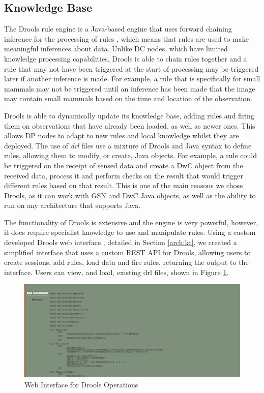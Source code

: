 		
	
	\subsection{Knowledge Base}\label{arch:kb}
	The Drools rule engine is a Java-based engine that uses forward chaining inference for the processing of rules \cite{proctor2005drools}, which means that rules are used to make meaningful inferences about data. Unlike DC nodes, which have limited knowledge processing capabilities, Drools is able to chain rules together and a rule that may not have been triggered at the start of processing may be triggered later if another inference is made. For example, a rule that is specifically for small mammals may not be triggered until an inference has been made that the image may contain small mammals based on the time and location of the observation.
	
	Drools is able to dynamically update its knowledge base, adding rules and firing them on observations that have already been loaded, as well as newer ones. This allows DP nodes to adapt to new rules and local knowledge whilst they are deployed. The use of \textit{drl} files use a mixture of Drools and Java syntax to define rules, allowing them to modify, or create, Java objects. For example, a rule could be triggered on the receipt of sensed data and create a DwC object from the received data, process it and perform checks on the result that would trigger different rules based on that result. This is one of the main reasons we chose Drools, as it can work with GSN and DwC Java objects, as well as the ability to run on any architecture that supports Java.
	
	The functionality of Drools is extensive and the engine is very powerful, however, it does require specialist knowledge to use and manipulate rules. Using a custom developed Drools web interface , detailed in Section \ref{arch:kc}, we created a simplified interface that uses a custom REST API for Drools, allowing users to create sessions, add rules, load data and fire rules, returning the output to the interface. Users can view, and load, existing drl files, shown in Figure \ref{kc:loris_drl}. 
	
		\begin{figure}[h]
		\centering
		\includegraphics[width=\textwidth]{Chap4/figures/rules}
		\caption{Web Interface for Drools Operations}
		\label{kc:loris_drl}
		\end{figure}
	
